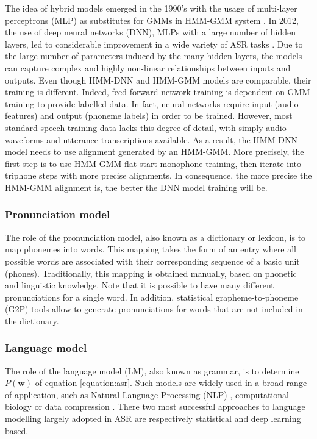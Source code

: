 The idea of hybrid models emerged in the 1990's with the usage of multi-layer perceptrons (MLP) as substitutes for GMMs in HMM-GMM system \cite{bourlard2012connectionist,meinedo2003audimus}. In 2012, the use of deep neural networks (DNN), MLPs with a large number of hidden layers, led to considerable improvement in a wide variety of ASR tasks \cite{hmm-dnn}. Due to the large number of parameters induced by the many hidden layers, the models can capture complex and highly non-linear relationships between inputs and outputs. Even though HMM-DNN and HMM-GMM models are comparable, their training is different. Indeed, feed-forward network training is dependent on GMM training to provide labelled data. In fact, neural networks require input (audio features) and output (phoneme labels) in order to be trained. However, most standard speech training data lacks this degree of detail, with simply audio waveforms and utterance transcriptions available. As a result, the HMM-DNN model needs to use alignment generated by an HMM-GMM. More precisely, the first step is to use HMM-GMM flat-start monophone training, then iterate into triphone steps with more precise alignments. In consequence, the more precise the HMM-GMM alignment is, the better the DNN model training will be. %

\subsubsection{Pronunciation model} %
The role of the pronunciation model, also known as a dictionary or lexicon, is to map phonemes into words. This mapping takes the form of an entry where all possible words are associated with their corresponding sequence of a basic unit (phones). Traditionally, this mapping is obtained manually, based on phonetic and linguistic knowledge. Note that it is possible to have many different pronunciations for a single word. In addition, statistical grapheme-to-phoneme (G2P) tools \cite{g2p} allow to generate pronunciations for words that are not included in the dictionary.

\subsubsection{Language model}%
The role of the language model (LM), also known as grammar, is to determine  $P(\boldsymbol{w})$ of equation \ref{equation:asr}. Such models are widely used in a broad range of application, such as Natural Language Processing (NLP) \cite{n-grams-NLP}, computational biology \cite{n-grams-computational_biology} or data compression \cite{n-gram-compression}. There two most successful approaches to language modelling largely adopted in ASR are respectively statistical and deep learning based.

